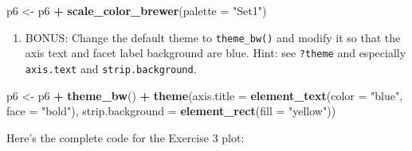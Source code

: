 \documentclass[
]{book}
\newenvironment{Shaded}{\begin{snugshade}}{\end{snugshade}}
\newcommand{\DataTypeTok}[1]{\textcolor[rgb]{0.13,0.29,0.53}{#1}}
\newcommand{\KeywordTok}[1]{\textcolor[rgb]{0.13,0.29,0.53}{\textbf{#1}}}
\newcommand{\NormalTok}[1]{#1}
\newcommand{\OperatorTok}[1]{\textcolor[rgb]{0.81,0.36,0.00}{\textbf{#1}}}
\newcommand{\StringTok}[1]{\textcolor[rgb]{0.31,0.60,0.02}{#1}}
\providecommand{\tightlist}{%
  \setlength{\itemsep}{0pt}\setlength{\parskip}{0pt}}
\begin{document}
\begin{Shaded}
\begin{Highlighting}[]
\NormalTok{p6 <-}\StringTok{ }\NormalTok{p6 }\OperatorTok{+}\StringTok{ }\KeywordTok{scale_color_brewer}\NormalTok{(}\DataTypeTok{palette =} \StringTok{"Set1"}\NormalTok{)}
\end{Highlighting}
\end{Shaded}

\begin{enumerate}
\def\labelenumi{\arabic{enumi}.}
\setcounter{enumi}{5}
\tightlist
\item
  BONUS: Change the default theme to \texttt{theme\_bw()} and modify it so that the axis text and facet label background are blue. Hint: see \texttt{?theme} and especially \texttt{axis.text} and \texttt{strip.background}.
\end{enumerate}

\begin{Shaded}
\begin{Highlighting}[]
\NormalTok{p6 <-}\StringTok{ }\NormalTok{p6 }\OperatorTok{+}\StringTok{ }\KeywordTok{theme_bw}\NormalTok{() }\OperatorTok{+}
\StringTok{    }\KeywordTok{theme}\NormalTok{(}\DataTypeTok{axis.title =} \KeywordTok{element_text}\NormalTok{(}\DataTypeTok{color =} \StringTok{"blue"}\NormalTok{, }\DataTypeTok{face =} \StringTok{"bold"}\NormalTok{),}
          \DataTypeTok{strip.background =} \KeywordTok{element_rect}\NormalTok{(}\DataTypeTok{fill =} \StringTok{"yellow"}\NormalTok{))}
\end{Highlighting}
\end{Shaded}

Here's the complete code for the Exercise 3 plot:
\end{document}
